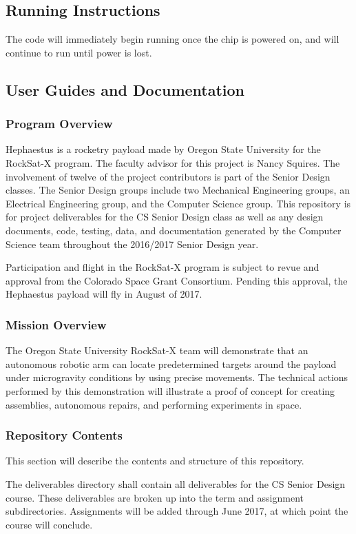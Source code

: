 \subsection{Running Instructions}
The code will immediately begin running once the chip is powered on, and will
continue to run until power is lost.

\subsection{User Guides and Documentation}
\subsubsection{Program Overview}
Hephaestus is a rocketry payload made by Oregon State University for the RockSat-X program. The faculty advisor for this project is Nancy Squires. The involvement of twelve of the project contributors is part of the Senior Design classes. The Senior Design groups include two Mechanical Engineering groups, an Electrical Engineering group, and the Computer Science group. This repository is for project deliverables for the CS Senior Design class as well as any design documents, code, testing, data, and documentation generated by the Computer Science team throughout the 2016/2017 Senior Design year.

Participation and flight in the RockSat-X program is subject to revue and approval from the Colorado Space Grant Consortium. Pending this approval, the Hephaestus payload will fly in August of 2017.

\subsubsection{Mission Overview}
The Oregon State University RockSat-X team will demonstrate that an autonomous robotic arm can locate predetermined targets around the payload under microgravity conditions by using precise movements. The technical actions performed by this demonstration will illustrate a proof of concept for creating assemblies, autonomous repairs, and performing experiments in space.

\subsubsection{Repository Contents}
This section will describe the contents and structure of this repository.

The deliverables directory shall contain all deliverables for the CS Senior Design course. These deliverables are broken up into the term and assignment subdirectories. Assignments will be added through June 2017, at which point the course will conclude.

